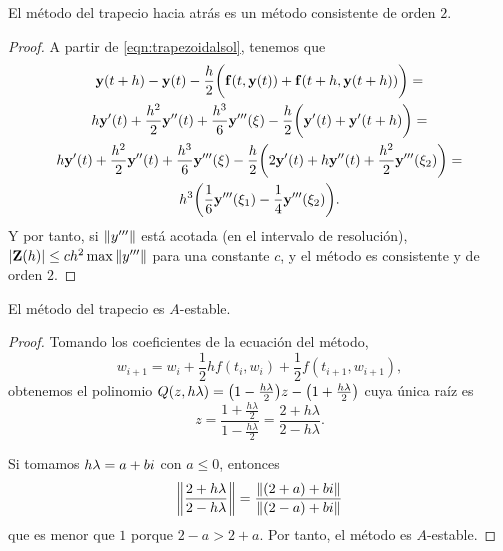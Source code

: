 \begin{proposition}
    El método del trapecio hacia atrás es un método consistente de orden $2$.
\end{proposition}

\begin{proof}
    A partir de \eqref{eqn:trapezoidalsol}, tenemos que 
    \begin{multline*}
        \vb{y}{}(t+h) - \vb{y}{}(t) - \frac{h}{2}\qty\bigg(
            \vb{f}{}(t, \vb{y}{}(t)) + \vb{f}{}(t+h, \vb{y}{}(t+h))
        ) = \\
        h\vb{y}{}'(t) + \frac{h^2}{2}\vb{y}{}''(t) + \frac{h^3}{6}\vb{y}{}'''(\xi)
            - \frac{h}{2}\qty\bigg(\vb{y}{}'(t) + \vb{y}{}'(t+h)) = \\
        h\vb{y}{}'(t) + \frac{h^2}{2}\vb{y}{}''(t) + \frac{h^3}{6}\vb{y}{}'''(\xi)
            - \frac{h}{2}\qty\bigg(2\vb{y}{}'(t) + h\vb{y}{}''(t)
            + \frac{h^2}{2}\vb{y}{}'''(\xi_2)) = \\
        h^3\qty\bigg(\frac{1}{6}\vb{y}{}'''(\xi_1) - \frac{1}{4}\vb{y}{}'''(\xi_2)).
    \end{multline*}
    Y por tanto, si $\norm{y'''}$ está acotada (en el intervalo de resolución),
    $\abs{\vb{Z}{}(h)} \le ch^2\max{\norm{y'''}}$
    para una constante $c$,
    y el método es consistente y de orden $2$.
\end{proof}

\begin{proposition}
    El método del trapecio es $A$-estable.
\end{proposition}

\begin{proof}
    Tomando los coeficientes de la ecuación del método,
    \begin{equation*}
        w_{i+1} = w_i + \frac{1}{2}hf(t_i, w_i) + \frac{1}{2}f(t_{i+1}, w_{i+1}),
    \end{equation*}
    obtenemos el polinomio
    $Q(z, h\lambda) = \qty(1 - \frac{h\lambda}{2})z - \qty(1+\frac{h\lambda}{2})$
    cuya única raíz es
    \begin{equation*}
        z = \frac{1 + \frac{h\lambda}{2}}{1 - \frac{h\lambda}{2}} =
        \frac{2 + h\lambda}{2 - h\lambda}.
    \end{equation*}

    Si tomamos $h\lambda = a + bi$ con $a \le 0$, entonces
    \begin{equation*}
        \norm{\frac{2 + h\lambda}{2 - h\lambda}} =
        \frac{\norm{(2+a) + bi}}{\norm{(2-a) + bi}}
    \end{equation*}
    que es menor que $1$ porque $2 - a > 2 + a$.
    Por tanto, el método es $A$-estable.
\end{proof}


